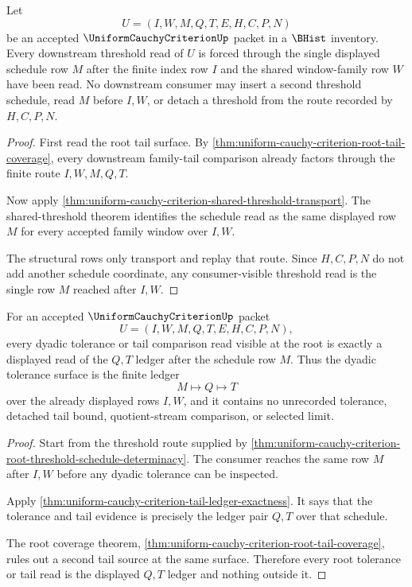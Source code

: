 \begin{theorem}
\label{thm:uniform-cauchy-criterion-root-threshold-schedule-determinacy}
Let
$$
U=(I,W,M,Q,T,E,H,C,P,N)
$$
be an accepted $\UniformCauchyCriterionUp$ packet in a $\BHist$ inventory. Every downstream threshold read of $U$ is forced through the single displayed schedule row $M$ after the finite index row $I$ and the shared window-family row $W$ have been read. No downstream consumer may insert a second threshold schedule, read $M$ before $I,W$, or detach a threshold from the route recorded by $H,C,P,N$.
\end{theorem}
\begin{proof}
First read the root tail surface. By \autoref{thm:uniform-cauchy-criterion-root-tail-coverage}, every downstream family-tail comparison already factors through the finite route $I,W,M,Q,T$.

Now apply \autoref{thm:uniform-cauchy-criterion-shared-threshold-transport}. The shared-threshold theorem identifies the schedule read as the same displayed row $M$ for every accepted family window over $I,W$.

The structural rows only transport and replay that route. Since $H,C,P,N$ do not add another schedule coordinate, any consumer-visible threshold read is the single row $M$ reached after $I,W$.
\end{proof}

\begin{theorem}
\label{thm:uniform-cauchy-criterion-root-tolerance-ledger-exactness}
For an accepted $\UniformCauchyCriterionUp$ packet
$$
U=(I,W,M,Q,T,E,H,C,P,N),
$$
every dyadic tolerance or tail comparison read visible at the root is exactly a displayed read of the $Q,T$ ledger after the schedule row $M$. Thus the dyadic tolerance surface is the finite ledger
$$
M \longmapsto Q \longmapsto T
$$
over the already displayed rows $I,W$, and it contains no unrecorded tolerance, detached tail bound, quotient-stream comparison, or selected limit.
\end{theorem}
\begin{proof}
Start from the threshold route supplied by \autoref{thm:uniform-cauchy-criterion-root-threshold-schedule-determinacy}. The consumer reaches the same row $M$ after $I,W$ before any dyadic tolerance can be inspected.

Apply \autoref{thm:uniform-cauchy-criterion-tail-ledger-exactness}. It says that the tolerance and tail evidence is precisely the ledger pair $Q,T$ over that schedule.

The root coverage theorem, \autoref{thm:uniform-cauchy-criterion-root-tail-coverage}, rules out a second tail source at the same surface. Therefore every root tolerance or tail read is the displayed $Q,T$ ledger and nothing outside it.
\end{proof}

